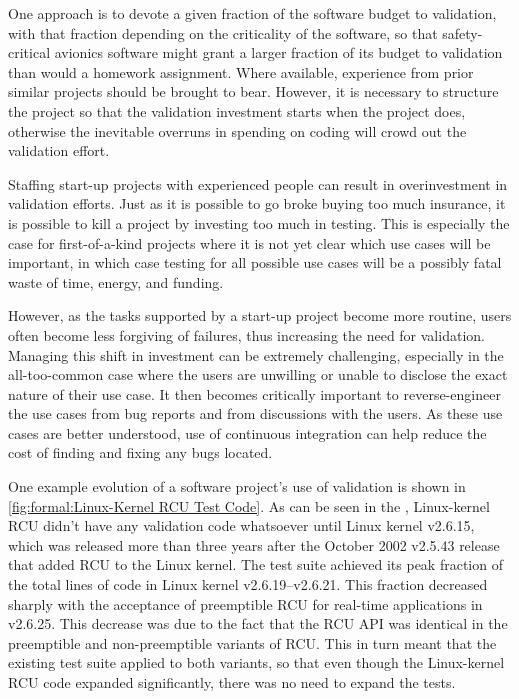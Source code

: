 One approach is to devote a given fraction of the software budget to
validation, with that fraction depending on the criticality of the
software, so that safety-critical avionics software might grant a
larger fraction of its budget to validation than would a homework
assignment.
Where available, experience from prior similar projects should be
brought to bear.
However, it is necessary to structure the project so that the validation
investment starts when the project does, otherwise the inevitable overruns
in spending on coding will crowd out the validation effort.

Staffing start-up projects with experienced people can result in
overinvestment in validation efforts.
Just as it is possible to go broke buying too much insurance, it is
possible to kill a project by investing too much in testing.
This is especially the case for first-of-a-kind projects where it is
not yet clear which use cases will be important, in which case testing
for all possible use cases will be a possibly fatal waste of time,
energy, and funding.

However, as the tasks supported by a start-up project become more routine,
users often become less forgiving of failures, thus increasing the need
for validation.
Managing this shift in investment can be extremely challenging,
especially in the all-too-common case where the users are unwilling
or unable to disclose the exact nature of their use case.
It then becomes critically important to reverse-engineer the
use cases from bug reports and from discussions with the users.
As these use cases are better understood, use of continuous integration
can help reduce the cost of finding and fixing any bugs located.


One example evolution of a software project's use of validation is
shown in
\cref{fig:formal:Linux-Kernel RCU Test Code}.
As can be seen in the ,
Linux-kernel RCU didn't have any validation code whatsoever until Linux
kernel v2.6.15, which was released more than three years after the
October 2002 v2.5.43 release that added RCU to the Linux kernel.
The test suite achieved its peak fraction of the total lines of code
in Linux kernel v2.6.19--v2.6.21.
This fraction decreased sharply with the acceptance of preemptible RCU
for real-time applications in v2.6.25.
This decrease was due to the fact that the RCU API was identical
in the preemptible and non-preemptible variants of RCU\@.
This in turn meant that the existing test suite applied to both variants,
so that even though the Linux-kernel RCU code expanded significantly,
there was no need to expand the tests.

